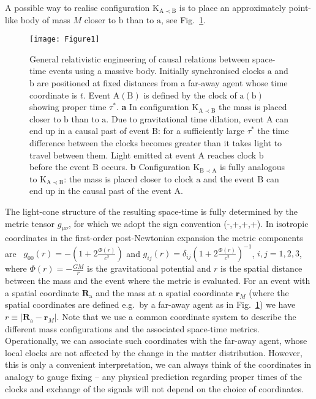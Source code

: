 \documentclass[a4paper,11pt]{article}
\begin{document}
A possible way to realise configuration $\mathrm{K_{A\prec B}}$ is to place an approximately point-like body of mass $M$ closer to $\mathrm b$ than to $\mathrm a$, see Fig.\ \ref{event_order}.
%
\begin{figure}[h!]
\centering
\texttt{[image: Figure1]}
\caption{General relativistic engineering of causal relations between space-time events using a massive body. Initially synchronised clocks $\mathrm a$ and $\mathrm b$ are positioned at fixed distances from a far-away agent whose time coordinate is $t$. Event $\mathrm{A (B)}$ is defined by the clock of $\mathrm{a (b)}$ showing proper time $\tau^*$. \textbf{a} In configuration $\mathrm{K_{A\prec B}}$ the mass is placed closer to $\mathrm b$ than to $\mathrm a$. Due to gravitational time dilation, event $\mathrm A$ can end up in a causal past of event $\mathrm B$: for a sufficiently large $\tau^*$ the time difference between the clocks becomes greater than it takes light to travel between them. Light emitted at event $ \mathrm A$ reaches clock $\mathrm b$ before the event $\mathrm B$ occurs. \textbf{b} Configuration $\mathrm{K_{B\prec A}}$ is fully analogous to $\mathrm{K_{A\prec B}}$: the mass is placed closer to clock $\mathrm a$ and the event $\mathrm B$ can end up in the causal past of the event $\mathrm A$. \hspace*{\fill}}
\label{event_order}
\end{figure}
%
The light-cone structure of the resulting space-time is fully determined by the metric tensor $g_{\mu \nu}$, for which we adopt the sign convention (-,+,+,+). In isotropic coordinates in the first-order post-Newtonian expansion the metric components are~\cite{WeinbergGR} $g_\mathrm{00}(r)=-\left(1+2\frac{\Phi(r)}{c^2}\right)$ and $g_{ij}(r)=\delta_{ij}\left(1+2\frac{\Phi(r)}{c^2}\right)^{-1}$, $i,j=1,2,3$, where $\Phi(r)=-\frac{G M}{r}$ is the gravitational potential and $r$ is the spatial distance between the mass and the event where the metric is evaluated. For an event with a spatial coordinate $\mathbf{R}_\mathrm{a}$
and the mass at a spatial coordinate $\mathbf{r}_M$ (where the spatial coordinates are defined e.g.~by a far-away agent as in Fig.~\ref{event_order}) we have $r\equiv| \mathbf{R}_\mathrm{a}-\mathbf{r}_M|$. Note that we use a common coordinate system to describe the different mass configurations and the associated space-time metrics. Operationally, we can associate such coordinates with the far-away agent, whose local clocks are not affected by the change in the matter distribution. However, this is only a convenient interpretation,  we can always think of the coordinates in analogy to gauge fixing -- any physical prediction regarding proper times of the clocks and exchange of the signals will not depend on the choice of coordinates.
\end{document}
